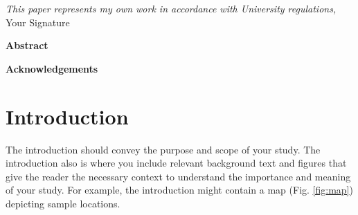 \documentclass[11pt]{report}
\begin{document}



\thispagestyle{empty}
\vspace*{3in}
\begin{center}
\emph{This paper represents my own work in accordance with University regulations,} \\
Your Signature %
\end{center}
\clearpage

\begin{center}
\Large \textbf{Abstract}
\end{center}
 
 \clearpage

\begin{center}
\Large \textbf{Acknowledgements}
\end{center}

\clearpage

\thispagestyle{empty}
\tableofcontents
\clearpage

\listoffigures
\listoftables
\clearpage

\fancyhead{}
\fancyfoot{}
\pagestyle{fancyplain}

{\newpage\renewcommand{\thepage}{\arabic{page}}\setcounter{page}{1}}


\section{Introduction \label{sec:introduction}}

The introduction should convey the purpose and scope of your study. The introduction also is where you include relevant background text and figures that give the reader the necessary context to understand the importance and meaning of your study. For example, the introduction might contain a map (Fig. \ref{fig:map}) depicting sample locations.
\end{document}
